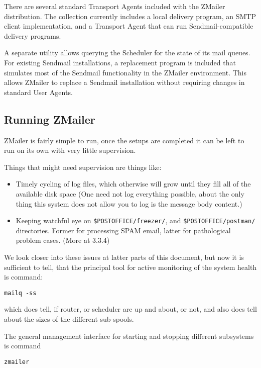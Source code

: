 There are several standard Transport Agents included with the ZMailer
distribution.  The collection currently includes a local delivery program,
an SMTP client implementation, and a Transport Agent that can run
Sendmail-compatible delivery programs.

A separate utility allows querying the Scheduler for the state of its mail
queues.  For existing Sendmail installations, a replacement program is
included that simulates most of the Sendmail functionality in the ZMailer
environment.  This allows ZMailer to replace a Sendmail installation
without requiring changes in standard User Agents.




\subsection{Running ZMailer}

ZMailer is fairly simple to run, once the setups are completed
it can be left to run on its own with very little supervision.

Things that might need supervision are things like:
\begin{itemize}
\item Timely cycling of log files, which otherwise will grow until
they fill all of the available disk space  (One need not log
everything possible, about the only thing this system does not
allow you to log is the message body content.)
\item Keeping watchful eye on  {\tt \$POSTOFFICE/freezer/}, and 
{\tt \$POSTOFFICE/postman/}
directories.  Former for processing SPAM email, latter for
pathological problem cases.  (More at  3.3.4)
\end{itemize}

We look closer into these issues at latter parts of this document,
but now it is sufficient to tell, that the principal tool for active
monitoring of the system health is command:
\begin{tscreen}
\begin{verbatim}
mailq -ss
\end{verbatim}
\end{tscreen}

which does tell, if router, or scheduler are up and about, or not,
and also does tell about the sizes of the different sub-spools.

The general management interface for starting and stopping different
subsystems is command
\begin{tscreen}
\begin{verbatim}
zmailer
\end{verbatim}
\end{tscreen}

